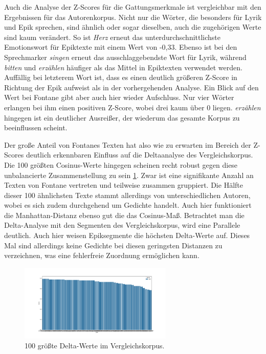 \documentclass[a4paper,10p]{article}
\begin{document}
Auch die Analyse der Z-Scores für die Gattungsmerkmale ist vergleichbar mit den Ergebnissen für das Autorenkorpus. Nicht nur die Wörter, die besonders für Lyrik und Epik sprechen, sind ähnlich oder sogar dieselben, auch die zugehörigen Werte sind kaum verändert. So ist \textit{Herz} erneut das unterdurchschnittlichste Emotionswort für Epiktexte mit einem Wert von -0,33. Ebenso ist bei den Sprechmarker \textit{singen} erneut das ausschlaggebendste Wort für Lyrik, während \textit{bitten} und \textit{erzählen} häufiger als das Mittel in Epiktexten verwendet werden. Auffällig bei letzterem Wort ist, dass es einen deutlich größeren Z-Score in Richtung der Epik aufweist als in der vorhergehenden Analyse. Ein Blick auf den Wert bei Fontane gibt aber auch hier wieder Aufschluss. Nur vier Wörter erlangen bei ihm einen positiven Z-Score, wobei drei kaum über 0 liegen. \textit{erzählen} hingegen ist ein deutlicher Ausreißer, der wiederum das gesamte Korpus zu beeinflussen scheint. \par 

Der große Anteil von Fontanes Texten hat also wie zu erwarten im Bereich der Z-Scores deutlich erkennbaren Einfluss auf die Deltaanalyse des Vergleichskorpus. Die 100 größten Cosinus-Werte hingegen scheinen recht robust gegen diese unbalancierte Zusammenstellung zu sein \ref{fig:100delta}. Zwar ist eine signifikante Anzahl an Texten von Fontane vertreten und teilweise zusammen gruppiert. Die Hälfte dieser 100 ähnlichsten Texte stammt allerdings von unterschiedlichen Autoren, wobei es sich zudem durchgehend um Gedichte handelt. Auch hier funktioniert die Manhattan-Distanz ebenso gut die das Cosinus-Maß. Betrachtet man die Delta-Analyse mit den Segmenten des Vergleichskorpus, wird eine Parallele deutlich. Auch hier weisen Epiksegmente die höchsten Delta-Werte auf. Dieses Mal sind allerdings keine Gedichte bei diesen geringsten Distanzen zu verzeichnen, was eine fehlerfreie Zuordnung ermöglichen kann. \par 

\begin{figure}
	\includegraphics[width=0.65\textwidth]{vergleich_100cos_gattung.png}
	\caption{100 größte Delta-Werte im Vergleichskorpus.}
	\label{fig:100delta}
\end{figure}
\end{document}
